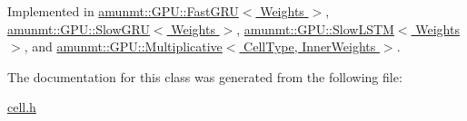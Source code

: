 Implemented in \hyperlink{classamunmt_1_1GPU_1_1FastGRU_ae99ea776f3f65eb593621f733feffeb0}{amunmt\+::\+G\+P\+U\+::\+Fast\+G\+R\+U$<$ Weights $>$}, \hyperlink{classamunmt_1_1GPU_1_1SlowGRU_a2e14dcf46c2e4a4a171a43eec99dba87}{amunmt\+::\+G\+P\+U\+::\+Slow\+G\+R\+U$<$ Weights $>$}, \hyperlink{classamunmt_1_1GPU_1_1SlowLSTM_aec4f004b4e6525758546bf164a5de90b}{amunmt\+::\+G\+P\+U\+::\+Slow\+L\+S\+T\+M$<$ Weights $>$}, and \hyperlink{classamunmt_1_1GPU_1_1Multiplicative_a5be06555bcb9b8415ae9558109aa2699}{amunmt\+::\+G\+P\+U\+::\+Multiplicative$<$ Cell\+Type, Inner\+Weights $>$}.



The documentation for this class was generated from the following file\+:\begin{DoxyCompactItemize}
\item 
\hyperlink{cell_8h}{cell.\+h}\end{DoxyCompactItemize}
